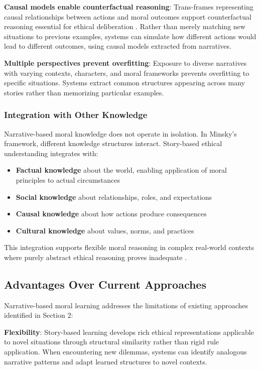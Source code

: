 \documentclass[12pt]{article}
\begin{document}
\textbf{Causal models enable counterfactual reasoning}: Trans-frames representing causal relationships between actions and moral outcomes support counterfactual reasoning essential for ethical deliberation \citep{pearl2009causality}. Rather than merely matching new situations to previous examples, systems can simulate how different actions would lead to different outcomes, using causal models extracted from narratives.

\textbf{Multiple perspectives prevent overfitting}: Exposure to diverse narratives with varying contexts, characters, and moral frameworks prevents overfitting to specific situations. Systems extract common structures appearing across many stories rather than memorizing particular examples.

\subsubsection{Integration with Other Knowledge}

Narrative-based moral knowledge does not operate in isolation. In Minsky's framework, different knowledge structures interact. Story-based ethical understanding integrates with:

\begin{itemize}
\item \textbf{Factual knowledge} about the world, enabling application of moral principles to actual circumstances
\item \textbf{Social knowledge} about relationships, roles, and expectations
\item \textbf{Causal knowledge} about how actions produce consequences
\item \textbf{Cultural knowledge} about values, norms, and practices
\end{itemize}

This integration supports flexible moral reasoning in complex real-world contexts where purely abstract ethical reasoning proves inadequate \citep{nussbaum1990love}.

\subsection{Advantages Over Current Approaches}

Narrative-based moral learning addresses the limitations of existing approaches identified in Section 2:

\textbf{Flexibility}: Story-based learning develops rich ethical representations applicable to novel situations through structural similarity rather than rigid rule application. When encountering new dilemmas, systems can identify analogous narrative patterns and adapt learned structures to novel contexts.
\end{document}
